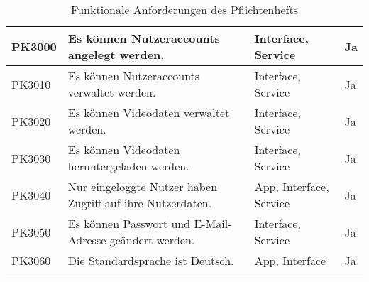 \begin{longtable}{p{} | p{} | p{} | p{}}
  PK3000 & Es können Nutzeraccounts angelegt werden. & Interface, Service & Ja
   \\
  \hline 
  PK3010 & Es können Nutzeraccounts verwaltet werden. & Interface, Service & Ja
   \\
  \hline 
  PK3020 & Es können Videodaten verwaltet werden. & Interface, Service & Ja
   \\
  \hline 
  PK3030 & Es können Videodaten heruntergeladen werden. & Interface, Service & Ja
   \\
  \hline 
  PK3040 & Nur eingeloggte Nutzer haben Zugriff auf ihre Nutzerdaten. & App, Interface, Service & Ja
   \\
  \hline 
  PK3050 & Es können Passwort und E-Mail-Adresse geändert werden. & Interface, Service & Ja
   \\
  \hline 
  PK3060 & Die Standardsprache ist Deutsch. & App, Interface & Ja
  \\
  \hline
  \caption{Funktionale Anforderungen des Pflichtenhefts}
 \end{longtable}


